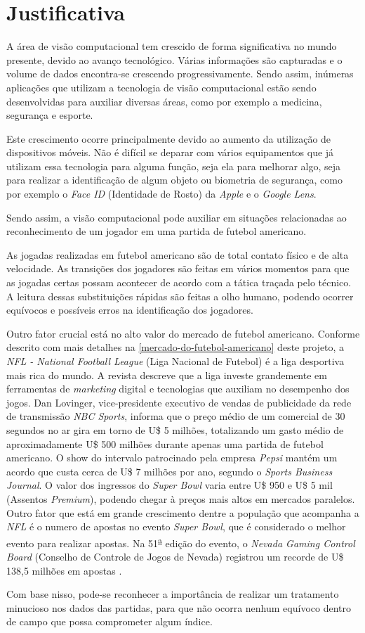 \section{\textbf{Justificativa}}

A área de visão computacional tem crescido de forma significativa no mundo presente, devido ao avanço tecnológico. Várias informações são capturadas e o volume de dados encontra-se crescendo progressivamente. Sendo assim, inúmeras aplicações que utilizam a tecnologia de visão computacional estão sendo desenvolvidas para auxiliar diversas áreas, como por exemplo a medicina, segurança e esporte.

Este crescimento ocorre principalmente devido ao aumento da utilização de dispositivos móveis. Não é difícil se deparar com vários equipamentos que já utilizam essa tecnologia para alguma função, seja ela para melhorar algo, seja para realizar a identificação de algum objeto ou biometria de segurança, como por exemplo o \textit{Face ID} (Identidade de Rosto) da \textit{Apple} e o \textit{Google Lens}.

Sendo assim, a visão computacional pode auxiliar em situações relacionadas ao reconhecimento de um jogador em uma partida de futebol americano.

As jogadas realizadas em futebol americano são de total contato físico e de alta velocidade. As transições dos jogadores são feitas em vários momentos para que as jogadas certas possam acontecer de acordo com a tática traçada pelo técnico. A leitura dessas substituições rápidas são feitas a olho humano, podendo ocorrer equívocos e possíveis erros na identificação dos jogadores.

Outro fator crucial está no alto valor do mercado de futebol americano. Conforme descrito com mais detalhes na \autoref{mercado-do-futebol-americano} deste projeto, a \textit{NFL - National Football League} (Liga Nacional de Futebol) é a liga desportiva mais rica do mundo. A revista  descreve que a liga investe grandemente em ferramentas de \textit{marketing} digital e tecnologias que auxiliam no desempenho dos jogos. Dan Lovinger, vice-presidente executivo de vendas de publicidade da rede de transmissão \textit{NBC Sports}, informa que o preço médio de um comercial de 30 segundos no ar gira em torno de U\$ 5 milhões, totalizando um gasto médio de aproximadamente U\$ 500 milhões durante apenas uma partida de futebol americano. O show do intervalo patrocinado pela empresa \textit{Pepsi} mantém um acordo que custa cerca de U\$ 7 milhões por ano, segundo o \textit{Sports Business Journal}. O valor dos ingressos do \textit{Super Bowl} varia entre U\$ 950 e U\$ 5 mil (Assentos \textit{Premium}), podendo chegar à preços mais altos em mercados paralelos. Outro fator que está em grande crescimento dentre a população que acompanha a \textit{NFL} é o numero de apostas no evento \textit{Super Bowl}, que é considerado o melhor evento para realizar apostas. Na 51\textsuperscript{\underline{a}} edição do evento, o \textit{Nevada Gaming Control Board} (Conselho de Controle de Jogos de Nevada) registrou um recorde de U\$ 138,5 milhões em apostas \cite{FORBES2018}.

Com base nisso, pode-se reconhecer a importância de realizar um tratamento minucioso nos dados das partidas, para que não ocorra nenhum equívoco dentro de campo que possa comprometer algum índice.